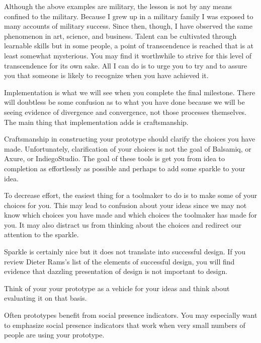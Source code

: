 Although the above examples are military, the lesson is not by any means
confined to the military. Because I grew up in a military family I was
exposed to many accounts of military success. Since then, though, I have
observed the same phenomenon in art, science, and business. Talent can
be cultivated through learnable skills but in some people, a point of
transcendence is reached that is at least somewhat mysterious. You may
find it worthwhile to strive for this level of transcendence for its own
sake. All I can do is to urge you to try and to assure you that someone
is likely to recognize when you have achieved it.

\hypertarget{implementation}{%
\label{implementation}}

Implementation is what we will see when you complete the final
milestone. There will doubtless be some confusion as to what you have
done because we will be seeing evidence of divergence and convergence,
not those processes themselves. The main thing that implementation adds
is craftsmanship.

\hypertarget{craftsmanship}{%
\label{craftsmanship}}

Craftsmanship in constructing your prototype should clarify the choices
you have made. Unfortunately, clarification of your choices is not the
goal of Balsamiq, or Axure, or IndiegoStudio. The goal of these tools is
get you from idea to completion as effortlessly as possible and perhaps
to add some sparkle to your idea.

To decrease effort, the easiest thing for a toolmaker to do is to make
some of your choices for you. This may lead to confusion about your
ideas since we may not know which choices you have made and which
choices the toolmaker has made for you. It may also distract us from
thinking about the choices and redirect our attention to the sparkle.

Sparkle is certainly nice but it does not translate into successful
design. If you review Dieter Rams's list of the elements of successful
design, you will find evidence that dazzling presentation of design is
not important to design.

Think of your your prototype as a vehicle for your ideas and think about
evaluating it on that basis.

\hypertarget{social-presence}{%
\label{social-presence}}

Often prototypes benefit from social presence indicators. You may
especially want to emphasize social presence indicators that work when
very small numbers of people are using your prototype.

